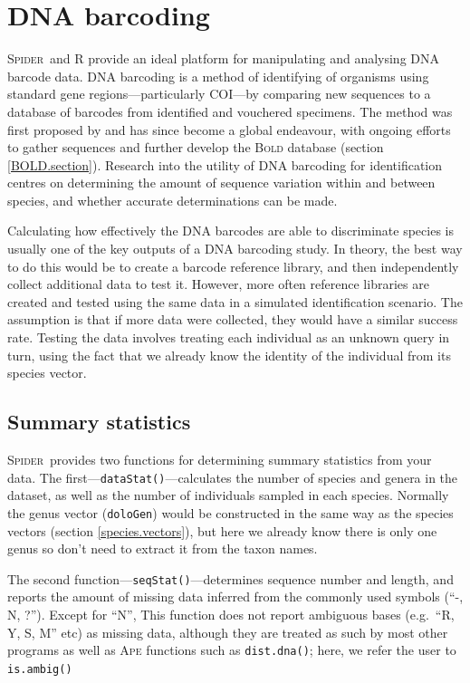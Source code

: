 \documentclass{article}
\newcommand{\Spider}{\textsc{Spider}} %
\newcommand{\progname}[1]{\textsc{#1}}
\newcommand{\fun}[1]{\texttt{#1}}
\begin{document}



\section{DNA barcoding}
\Spider~and R provide an ideal platform for manipulating and analysing DNA barcode data. DNA barcoding is a method of identifying of organisms using standard gene regions---particularly COI---by comparing new sequences to a database of barcodes from identified and vouchered specimens. The method was first proposed by \citet{Her.etal.2003.barcoding} and has since become a global endeavour, with ongoing efforts to gather sequences and further develop the \progname{Bold} database (section \ref{BOLD.section}). Research into the utility of DNA barcoding for identification centres on determining the amount of sequence variation within and between species, and whether accurate determinations can be made. 

Calculating how effectively the DNA barcodes are able to discriminate species is usually one of the key outputs of a DNA barcoding study. In theory, the best way to do this would be to create a barcode reference library, and then independently collect additional data to test it. However, more often reference libraries are created and tested using the same data in a simulated identification scenario. The assumption is that if more data were collected, they would have a similar success rate. Testing the data involves treating each individual as an unknown query in turn, using the fact that we already know the identity of the individual from its species vector. 


\subsection{Summary statistics}
\Spider~provides two functions for determining summary statistics from your data. The first---\fun{dataStat()}---calculates the number of species and genera in the dataset, as well as the number of individuals sampled in each species. Normally the genus vector (\fun{doloGen}) would be constructed in the same way as the species vectors (section \ref{species.vectors}), but here we already know there is only one genus so don't need to extract it from the taxon names.

The second function---\fun{seqStat()}---determines sequence number and length, and reports the amount of missing data inferred from the commonly used symbols (``-, N, ?''). Except for ``N'', This function does not report ambiguous bases (e.g.\ ``R, Y, S, M'' etc)  as missing data, although they are treated as such by most other programs as well as \progname{Ape} functions such as \fun{dist.dna()}; here, we refer the user to \fun{is.ambig()}
\end{document}
